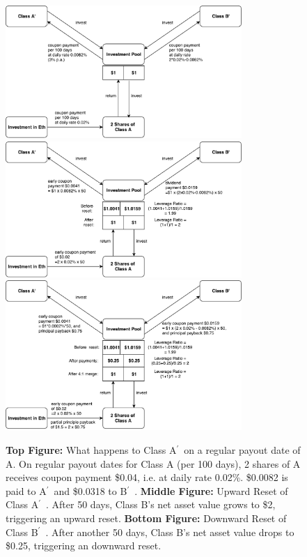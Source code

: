 \documentclass[draft, noinfoline]{ectaart}
\numberwithin{equation}{section}
\theoremstyle{plain}
\newcommand{\Ap}{A\ensuremath{^\prime}~}
\newcommand{\Bp}{B\ensuremath{^\prime}~}
\begin{document}
\begin{figure}[p]
\centering
	\includegraphics[width=0.8\textwidth]{Ap_periodic}
	\vspace{1em}
	\includegraphics[width=0.8\textwidth]{Ap_upward}
	\vspace{1em}
	\includegraphics[width=0.8\textwidth]{Ap_downward}
	\caption{{\bf Top Figure:} What happens to Class \Ap on a regular payout date of A. On regular payout dates for Class A (per 100 days), 2 shares of A receives coupon payment \$0.04, i.e. at daily rate 0.02\%. \$0.0082 is paid to \Ap and \$0.0318 to \Bp. {\bf Middle Figure:} Upward Reset of Class \Ap. After 50 days, Class B's net asset value grows to \$2, triggering an upward reset. {\bf Bottom Figure:} Downward Reset of Class \Bp. After another 50 days, Class B's net asset value drops to \$0.25, triggering an downward reset. }\label{fig:Ap}
\end{figure}
\end{document}
